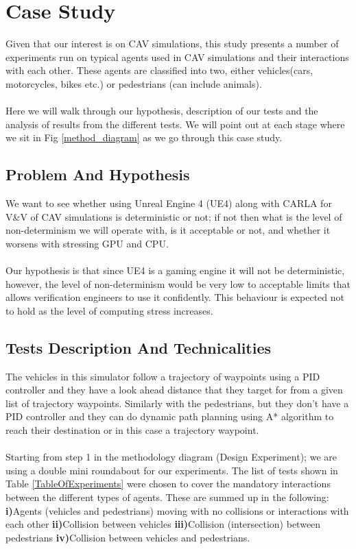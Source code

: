 \section{Case Study} \label{CaseStudy}
\noindent Given that our interest is on CAV simulations, this study presents a number of experiments run on typical agents used in CAV simulations and their interactions with each other. These agents are classified into two, either vehicles(cars, motorcycles, bikes etc.) or pedestrians (can include animals). \\\\
Here we will walk through our hypothesis, description of our tests and the analysis of results from the different tests. We will point out at each stage where we sit in Fig \ref{method_diagram} as we go through this case study.    

\subsection{Problem And Hypothesis}
\noindent We want to see whether using Unreal Engine 4 (UE4) along with CARLA \cite{CARLA_paper} for V\&V of CAV simulations is deterministic or not; if not then what is the level of non-determinism we will operate with, is it acceptable or not, and whether it worsens with stressing GPU and CPU.\\\\
Our hypothesis is that since UE4 is a gaming engine it will not be deterministic, however, the level of non-determinism would be very low to acceptable limits that allows verification engineers to use it confidently.
This behaviour is expected not to hold as the level of computing stress increases.     

\subsection{Tests Description And Technicalities}\label{TestsDescriptionAndTechnicalities}
\noindent The vehicles in this simulator follow a trajectory of waypoints using a PID controller and they have a look ahead distance that they target for from a given list of trajectory waypoints. 
Similarly with the pedestrians, but they don't have a PID controller and they can do dynamic path planning using A* algorithm to reach their destination or in this case a trajectory waypoint.\\\\ 
\noindent Starting from step 1 in the methodology diagram (Design Experiment); we are using a double mini roundabout for our experiments. 
The list of tests shown in Table \ref{TableOfExperiments} were chosen to cover the mandatory interactions between the different types of agents. 
These are summed up in the following: \textbf{i)}Agents (vehicles and pedestrians) moving with no collisions or interactions with each other \textbf{ii)}Collision between vehicles \textbf{iii)}Collision (intersection) between pedestrians \textbf{iv)}Collision between vehicles and pedestrians.

